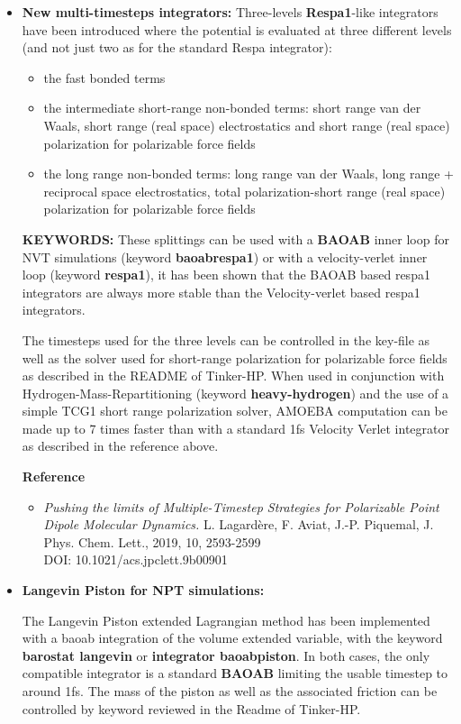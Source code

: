 \documentclass[]{article}
\begin{document}
\begin{itemize}
\item \textbf{New multi-timesteps integrators:}
Three-levels \textbf{Respa1}-like integrators have been introduced where the potential is evaluated at three different levels (and not just two as for the standard Respa integrator):
\begin{itemize}
    \item the fast bonded terms
    \item the intermediate short-range non-bonded terms: short range van der Waals, short range (real space) electrostatics and short range (real space) polarization for polarizable force fields
\item the long range non-bonded terms: long range van der Waals, long range     + reciprocal space electrostatics, total polarization-short range (real     space) polarization for polarizable force fields
\end{itemize}

\textbf{KEYWORDS:} These splittings can be used with a \textbf{BAOAB} inner loop for NVT simulations (keyword \textbf{baoabrespa1}) or with a velocity-verlet inner loop (keyword \textbf{respa1}), it has been shown that the BAOAB based respa1 integrators are always more stable than the Velocity-verlet based respa1 integrators.

 The timesteps used for the three levels can be controlled in the key-file as well as the solver used for short-range polarization for polarizable force fields as described in the README of Tinker-HP. When used in conjunction with Hydrogen-Mass-Repartitioning (keyword \textbf{heavy-hydrogen}) and the use of a simple TCG1 short range polarization solver, AMOEBA computation can be made up to 7 times faster than with a standard 1fs Velocity Verlet integrator as described in the reference above.
 
\textbf{Reference}

\begin{itemize}
    \item {\em Pushing the limits of Multiple-Timestep Strategies for Polarizable Point Dipole Molecular Dynamics.}
L. Lagardère, F. Aviat, J.-P. Piquemal, J. Phys. Chem. Lett., 2019, 10, 2593-2599 \\ DOI: 10.1021/acs.jpclett.9b00901
\end{itemize}

\item \textbf{Langevin Piston for NPT simulations:}

The Langevin Piston extended Lagrangian method has been implemented with a baoab integration of the volume extended variable, with the keyword \textbf{barostat langevin} or \textbf{integrator baoabpiston}. In both cases, the only compatible integrator is a standard \textbf{BAOAB} limiting the usable timestep to around 1fs. The mass of the piston as well as the associated friction can be controlled by keyword reviewed in the Readme  of Tinker-HP.


\end{itemize}
\end{document}
